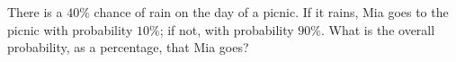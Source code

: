 There is a $40\%$ chance of rain on the day of a picnic. If it rains, Mia goes to the picnic with probability $10\%$; if not, with probability $90\%$. What is the overall probability, as a percentage, that Mia goes?
